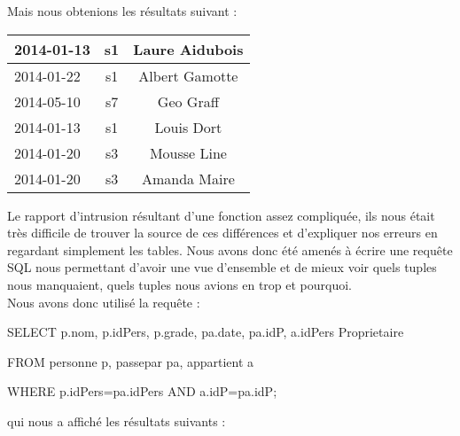 Mais nous obtenions les résultats suivant :
\begin{center}
	\begin{tabular}
		{| l |	c |	c |} \hline
		2014-01-13 & s1 & Laure Aidubois \\ \hline
		2014-01-22 & s1 & Albert Gamotte \\ \hline
		2014-05-10 & s7 & Geo Graff \\ \hline
		2014-01-13 & s1 & Louis Dort \\ \hline
		2014-01-20 & s3 & Mousse Line \\ \hline
		2014-01-20 & s3 & Amanda Maire \\ \hline
	\end{tabular}
\end{center}



Le rapport d'intrusion résultant d'une fonction assez compliquée, ils nous était très difficile de trouver la source de ces différences et d'expliquer nos erreurs en regardant simplement les tables. Nous avons donc été amenés à écrire une requête SQL nous permettant d'avoir une vue d'ensemble et de mieux voir quels tuples nous manquaient, quels tuples nous avions en trop et pourquoi.\\

Nous avons donc utilisé la requête :

SELECT p.nom, p.idPers, p.grade, pa.date, pa.idP, a.idPers Proprietaire 

FROM personne p, passepar pa, appartient a 

WHERE p.idPers=pa.idPers AND a.idP=pa.idP;

qui nous a affiché les résultats suivants :


